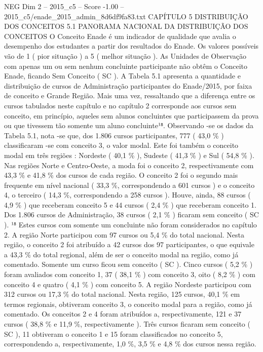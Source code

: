 \begin{textsample}{NEG Dim 2 – 2015\_c5 – Score -1.00 – 2015\_c5/enade\_2015\_admin\_8d6df9fa83.txt}  \label{ex:f2_neg_156}
CAPÍTULO 5 DISTRIBUIÇÃO DOS CONCEITOS 5.1 PANORAMA NACIONAL DA DISTRIBUIÇÃO DOS CONCEITOS O Conceito Enade é um indicador de qualidade que avalia o desempenho dos estudantes a partir dos resultados do Enade.
Os valores possíveis vão de 1 ( pior situação ) a 5 ( melhor situação ).
As Unidades de Observação com apenas um ou sem nenhum concluinte participante não obtêm o Conceito Enade, ficando Sem Conceito ( SC ).
A Tabela 5.1 apresenta a quantidade e distribuição de cursos de Administração participantes do Enade/2015, por faixa de conceito e Grande Região.
Mais uma vez, ressaltando que a diferença entre os cursos tabulados neste capítulo e no capítulo 2 corresponde aos cursos sem conceito, em princípio, aqueles sem alunos concluintes que participassem da prova ou que tivessem tão somente um aluno concluinte¹⁸.
Observando -se os dados da Tabela 5.1, nota -se que, dos 1.806 cursos participantes, 777 ( 43,0 \% ) classificaram -se com conceito 3, o valor modal.
Este foi também o conceito modal em três regiões : Nordeste ( 40,1 \% ), Sudeste ( 41,3 \% ) e Sul ( 54,8 \% ).
Nas regiões Norte e Centro-Oeste, a moda foi o conceito 2, respectivamente com 43,3 \% e 41,8 \% dos cursos de cada região.
O conceito 2 foi o segundo mais frequente em nível nacional ( 33,3 \%, correspondendo a 601 cursos ) e o conceito 4, o terceiro ( 14,3 \%, correspondendo a 258 cursos ).
Houve, ainda, 88 cursos ( 4,9 \% ) que receberam conceito 5 e 44 cursos ( 2,4 \% ) que receberam conceito 1.
Dos 1.806 cursos de Administração, 38 cursos ( 2,1 \% ) ficaram sem conceito ( SC ). ¹⁸ Estes cursos com somente um concluinte não foram considerados no capítulo 2.
A região Norte participou com 97 cursos ou 5,4 \% do total nacional.
Nesta região, o conceito 2 foi atribuído a 42 cursos dos 97 participantes, o que equivale a 43,3 \% do total regional, além de ser o conceito modal na região, como já comentado.
Somente um curso ficou sem conceito ( SC ).
Cinco cursos ( 5,2 \% ) foram avaliados com conceito 1, 37 ( 38,1 \% ) com conceito 3, oito ( 8,2 \% ) com conceito 4 e quatro ( 4,1 \% ) com conceito 5.
A região Nordeste participou com 312 cursos ou 17,3 \% do total nacional.
Nesta região, 125 cursos, 40,1 \% em termos regionais, obtiveram conceito 3, o conceito modal para a região, como já comentado.
Os conceitos 2 e 4 foram atribuídos a, respectivamente, 121 e 37 cursos ( 38,8 \% e 11,9 \%, respectivamente ).
Três cursos ficaram sem conceito ( SC ), 11 obtiveram o conceito 1 e 15 foram classificados no conceito 5, correspondendo a, respectivamente, 1,0 \%, 3,5 \% e 4,8 \% dos cursos nessa região.

\end{textsample}
